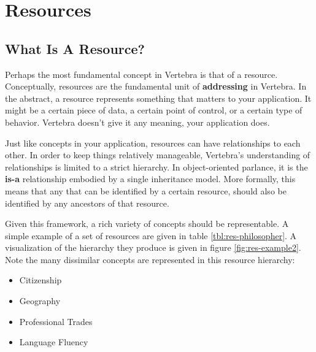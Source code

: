 \newcommand{\resource}{{\sf resource}}
\newcommand{\resources}{{\sf resources}}
\newcommand{\Resource}{{\sf Resource}}
\newcommand{\Resources}{{\sf Resources}}

\section{Resources}


\subsection{What Is A Resource?}


Perhaps the most fundamental concept in Vertebra is that of a \resource{}.  Conceptually, \resources{} are the fundamental unit of \textbf{addressing} in Vertebra.  In the abstract, a \resource{} represents something that matters to your application.  It might be a certain piece of data, a certain point of control, or a certain type of behavior.  Vertebra doesn't give it any meaning, your application does.

Just like concepts in your application, \resources{} can have relationships to each other.  In order to keep things relatively manageable, Vertebra's understanding of relationships is limited to a strict hierarchy.  In object-oriented parlance, it is the {\bf is-a} relationship embodied by a single inheritance model.  More formally, this means that any \agent{} that can be identified by a certain \resource, should also be identified by any ancestors of that \resource{}.

Given this framework, a rich variety of concepts should be representable.  A simple example of a set of resources are given in table \ref{tbl:res-philosopher}.  A visualization of the hierarchy they produce is given in figure \ref{fig:res-example2}.  Note the many dissimilar concepts are represented in this \resource{} hierarchy:

\begin{itemize}
	\item Citizenship
	\item Geography
	\item Professional Trades
	\item Language Fluency
\end{itemize}

